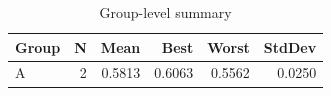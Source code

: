 \begin{table}[htbp]
\centering
\caption{Group-level summary}
\label{tab:group-summary}
\begin{tabular}{lrrrrr}
\toprule
\textbf{Group} & \textbf{N} & \textbf{Mean} & \textbf{Best} & \textbf{Worst} & \textbf{StdDev} \\
\midrule
A & 2 & 0.5813 & 0.6063 & 0.5562 & 0.0250 \\
\bottomrule
\end{tabular}
\end{table}